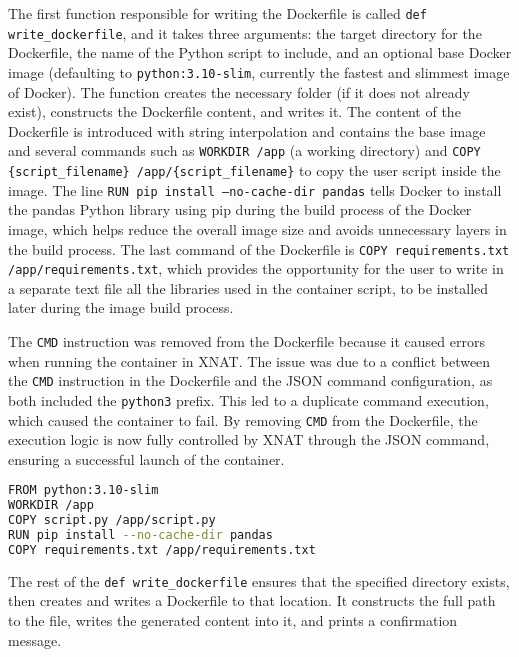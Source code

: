 The first function responsible for writing the Dockerfile is called \texttt{def write\_dockerfile}, and it takes three arguments: the target directory for the Dockerfile, the name of the Python script to include, and an optional base Docker image (defaulting to \texttt{python:3.10-slim}, currently the fastest and slimmest image of Docker). The function creates the necessary folder (if it does not already exist), constructs the Dockerfile content, and writes it. The content of the Dockerfile is introduced with string interpolation and contains the base image and several commands such as \texttt{WORKDIR /app} (a working directory) and \texttt{COPY \{script\_filename\} /app/\{script\_filename\}} to copy the user script inside the image. The line \texttt{RUN pip install --no-cache-dir pandas} tells Docker to install the pandas Python library using pip during the build process of the Docker image, which helps reduce the overall image size and avoids unnecessary layers in the build process. The last command of the Dockerfile is \texttt{COPY requirements.txt /app/requirements.txt}, which provides the opportunity for the user to write in a separate text file all the libraries used in the container script, to be installed later during the image build process.


The \texttt{CMD} instruction was removed from the Dockerfile because it caused errors when running the container in XNAT. The issue was due to a conflict between the \texttt{CMD} instruction in the Dockerfile and the JSON command configuration, as both included the \texttt{python3} prefix. This led to a duplicate command execution, which caused the container to fail. By removing \texttt{CMD} from the Dockerfile, the execution logic is now fully controlled by XNAT through the JSON command, ensuring a successful launch of the container.

\begin{lstlisting}[language=bash,caption={Dockerfile}]
FROM python:3.10-slim
WORKDIR /app
COPY script.py /app/script.py
RUN pip install --no-cache-dir pandas
COPY requirements.txt /app/requirements.txt
\end{lstlisting}

The rest of the \texttt{def write\_dockerfile} ensures that the specified directory exists, then creates and writes a Dockerfile to that location. It constructs the full path to the file, writes the generated content into it, and prints a confirmation message.



